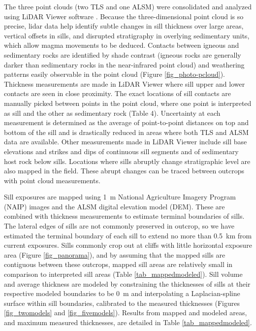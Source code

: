 \documentclass[12pt,letter]{article}
\begin{document}
The three point clouds (two TLS and one ALSM) were consolidated and analyzed using LiDAR Viewer software \citep{kreylos2008immersive}. Because the three-dimensional point cloud is so precise, lidar data help identify subtle changes in sill thickness over large areas, vertical offsets in sills, and disrupted stratigraphy in overlying sedimentary units, which allow magma movements to be deduced. Contacts between igneous and sedimentary rocks are identified by shade contrast (igneous rocks are generally darker than sedimentary rocks in the near-infrared point cloud) and weathering patterns easily observable in the point cloud (Figure \ref{fig_photo-pcloud}). Thickness measurements are made in LiDAR Viewer where sill upper and lower contacts are seen in close proximity. The exact locations of sill contacts are manually picked between points in the point cloud, where one point is interpreted as sill and the other as sedimentary rock (Table 4). Uncertainty at each measurement is determined as the average of point-to-point distances on top and bottom of the sill and is drastically reduced in areas where both TLS and ALSM data are available. Other measurements made in LiDAR Viewer include sill base elevations and strikes and dips of continuous sill segments and of sedimentary host rock below sills. Locations where sills abruptly change stratigraphic level are also mapped in the field. These abrupt changes can be traced between outcrops with point cloud measurements.

Sill exposures are mapped using 1~m National Agriculture Imagery Program (NAIP) images and the ALSM digital elevation model (DEM). These are combined with thickness measurements to estimate terminal boundaries of sills. The lateral edges of sills are not commonly preserved in outcrop, so we have estimated the terminal boundary of each sill to extend no more than 0.5~km from current exposures. Sills commonly crop out at cliffs with little horizontal exposure area (Figure \ref{fig_panorama}), and by assuming that the mapped sills are contiguous between these outcrops, mapped sill areas are relatively small in comparison to interpreted sill areas (Table \ref{tab_mappedmodeled}). Sill volume and average thickness are modeled by constraining the thicknesses of sills at their respective modeled boundaries to be 0~m and interpolating a Laplacian-spline surface within sill boundaries, calibrated to the measured thicknesses (Figures \ref{fig_twomodels} and \ref{fig_fivemodels}). Results from mapped and modeled areas, and maximum measured thicknesses, are detailed in Table \ref{tab_mappedmodeled}.
\end{document}
